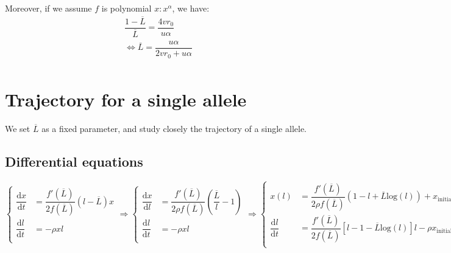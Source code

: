 \documentclass{article}
\begin{document}
Moreover, if we assume $f$ is polynomial $x: x^{\alpha}$, we have:
\begin{equation}
  \begin{aligned}
    \dfrac{1 - \overline{L}}{\overline{L}} =  \dfrac{4 v r_0}{ u \alpha} \\
    \iff \overline{L} =  \dfrac{u \alpha}{2 v r_0 +  u \alpha} \\
  \end{aligned}
\end{equation}

\section{Trajectory for a single allele}

We set $\overline{L}$ as a fixed parameter, and study closely the trajectory of a single allele.


\subsection{Differential equations}

\begin{equation}
  \left\{
      \begin{aligned}
          \dfrac{\mathrm{d}x}{\mathrm{d}t} &= \dfrac{f'(\overline{L})}{2 f(\overline{L})} \left( l - \overline{L} \right) x \\
        \dfrac{\mathrm{d}l}{\mathrm{d}t} &= 
        - \rho x l \\
      \end{aligned}
    \right.
 \Rightarrow
  \left\{
      \begin{aligned}
          \dfrac{\mathrm{d}x}{\mathrm{d}l} &= \dfrac{f'(\overline{L})}{2 \rho f(\overline{L})}\left( \dfrac{\overline{L}}{l} -1 \right) \\
        \dfrac{\mathrm{d}l}{\mathrm{d}t} &= 
        - \rho x l \\
      \end{aligned}
    \right.
 \Rightarrow
  \left\{
      \begin{aligned}
          x(l) &=\dfrac{f'(\overline{L})}{2 \rho f(\overline{L})} (1-l + \overline{L} \mathrm{log}(l)) + x_{\mathrm{initial}} \\
        \dfrac{\mathrm{d}l}{\mathrm{d}t} &= 
         \dfrac{f'(\overline{L})}{2 f(\overline{L})} [ l-1- \overline{L} \mathrm{log}(l)]l  - \rho x_{\mathrm{initial}} l \\
      \end{aligned}
    \right.
\end{equation}
\end{document}
